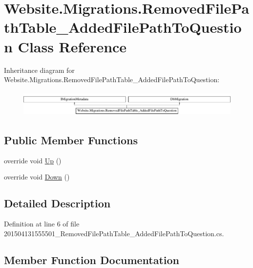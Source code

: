 \hypertarget{class_website_1_1_migrations_1_1_removed_file_path_table___added_file_path_to_question}{}\section{Website.\+Migrations.\+Removed\+File\+Path\+Table\+\_\+\+Added\+File\+Path\+To\+Question Class Reference}
\label{class_website_1_1_migrations_1_1_removed_file_path_table___added_file_path_to_question}
Inheritance diagram for Website.\+Migrations.\+Removed\+File\+Path\+Table\+\_\+\+Added\+File\+Path\+To\+Question\+:\begin{figure}[H]
\begin{center}
\leavevmode
\includegraphics[height=1.352657cm]{class_website_1_1_migrations_1_1_removed_file_path_table___added_file_path_to_question}
\end{center}
\end{figure}
\subsection*{Public Member Functions}
\begin{DoxyCompactItemize}
\item 
override void \hyperlink{class_website_1_1_migrations_1_1_removed_file_path_table___added_file_path_to_question_a91fed4f618e9677ad775b929965a55c9}{Up} ()
\item 
override void \hyperlink{class_website_1_1_migrations_1_1_removed_file_path_table___added_file_path_to_question_a09ef758f62943c6c9f52091d8dcd52be}{Down} ()
\end{DoxyCompactItemize}


\subsection{Detailed Description}


Definition at line 6 of file 201504131555501\+\_\+\+Removed\+File\+Path\+Table\+\_\+\+Added\+File\+Path\+To\+Question.\+cs.



\subsection{Member Function Documentation}
\hypertarget{class_website_1_1_migrations_1_1_removed_file_path_table___added_file_path_to_question_a09ef758f62943c6c9f52091d8dcd52be}{}
